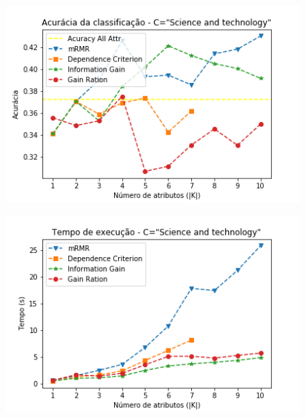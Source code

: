 \documentclass{beamer}
\begin{document}
\begin{frame}
	\begin{figure}[ht]
		\begin{center}
 	 	  \includegraphics[scale=0.7]{figuras/Acuracy_Science_and_technology.png}	
		  \label{fig:fluxogramaAG}		
		\end{center}
	\end{figure}
\end{frame}



\begin{frame}
	\begin{figure}[ht]
		\begin{center}
 	 	  \includegraphics[scale=0.7]{figuras/Time_Science_and_technology.png}	
		  \label{fig:fluxogramaAG}		
		\end{center}
	\end{figure}
\end{frame}
\end{document}

